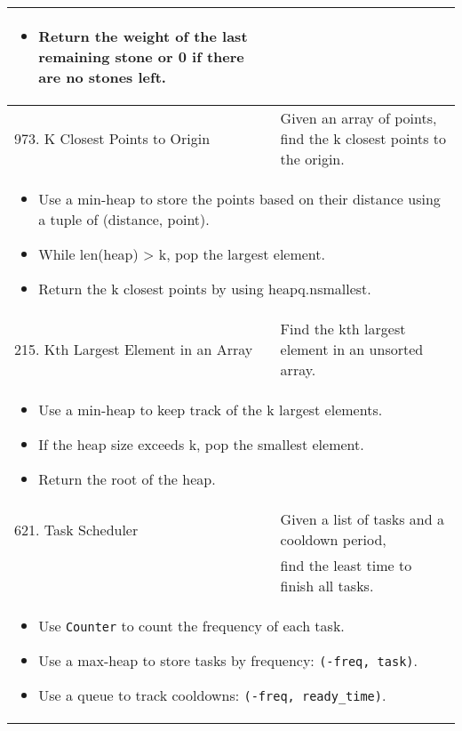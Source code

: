 \begin{summary}
\begin{center}
\begin{tabular}{ll}
{\begin{itemize}
                        \item Return the weight of the last remaining stone or 0 if there are no stones left.
                    \end{itemize}
                } \\
            \midrule
            973. K Closest Points to Origin & Given an array of points, find the k closest points to the origin. \\
            \multicolumn{2}{p{\linewidth}}{
                    \begin{itemize}
                        \item Use a min-heap to store the points based on their distance using a tuple of (distance, point).
                        \item While len(heap) > k, pop the largest element.
                        \item Return the k closest points by using heapq.nsmallest.
                    \end{itemize}
                } \\
            \midrule
            215. Kth Largest Element in an Array & Find the kth largest element in an unsorted array. \\
            \multicolumn{2}{p{\linewidth}}{
                    \begin{itemize}
                        \item Use a min-heap to keep track of the k largest elements.
                        \item If the heap size exceeds k, pop the smallest element.
                        \item Return the root of the heap.
                    \end{itemize}
                } \\
            \midrule
            621. Task Scheduler & Given a list of tasks and a cooldown period, \\
            & find the least time to finish all tasks. \\
            \multicolumn{2}{p{\linewidth}}{
                \begin{itemize}
                    \item Use \texttt{Counter} to count the frequency of each task.
                    \item Use a max-heap to store tasks by frequency: \texttt{(-freq, task)}.
                    \item Use a queue to track cooldowns: \texttt{(-freq, ready\_time)}.

\end{itemize}}
\end{tabular}
\end{center}
\end{summary}
